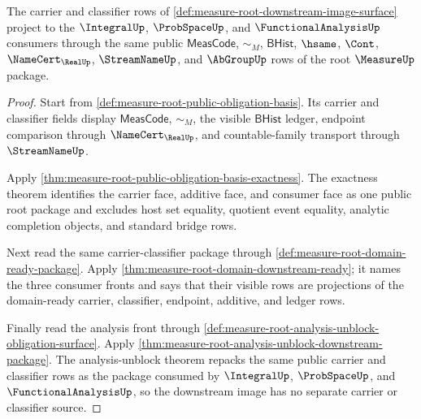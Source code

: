 \begin{theorem}
\label{thm:measure-root-downstream-image-carrier}
The carrier and classifier rows of
\autoref{def:measure-root-downstream-image-surface} project to the
$\IntegralUp$, $\ProbSpaceUp$, and $\FunctionalAnalysisUp$ consumers through
the same public $\mathsf{MeasCode}$, $\sim_M$, $\mathsf{BHist}$, $\hsame$,
$\Cont$, $\NameCert_{\RealUp}$, $\StreamNameUp$, and $\AbGroupUp$ rows of the
root $\MeasureUp$ package.
\end{theorem}
\begin{proof}
Start from \autoref{def:measure-root-public-obligation-basis}. Its carrier
and classifier fields display $\mathsf{MeasCode}$, $\sim_M$, the visible
$\mathsf{BHist}$ ledger, endpoint comparison through $\NameCert_{\RealUp}$,
and countable-family transport through $\StreamNameUp$.

Apply \autoref{thm:measure-root-public-obligation-basis-exactness}. The
exactness theorem identifies the carrier face, additive face, and consumer
face as one public root package and excludes host set equality, quotient
event equality, analytic completion objects, and standard bridge rows.

Next read the same carrier-classifier package through
\autoref{def:measure-root-domain-ready-package}. Apply
\autoref{thm:measure-root-domain-downstream-ready}; it names the three
consumer fronts and says that their visible rows are projections of the
domain-ready carrier, classifier, endpoint, additive, and ledger rows.

Finally read the analysis front through
\autoref{def:measure-root-analysis-unblock-obligation-surface}. Apply
\autoref{thm:measure-root-analysis-unblock-downstream-package}. The
analysis-unblock theorem repacks the same public carrier and classifier rows
as the package consumed by $\IntegralUp$, $\ProbSpaceUp$, and
$\FunctionalAnalysisUp$, so the downstream image has no separate carrier or
classifier source.
\end{proof}


